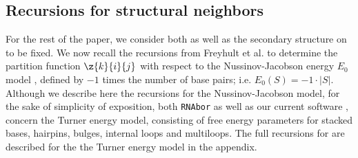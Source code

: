 \subsection*{Recursions for structural neighbors}

For the rest of the paper, we consider both \seq as well as the
secondary structure \strSt on \seq to be fixed. We now recall the
recursions from Freyhult et al. \cite{Freyhult.ab05} to determine
the partition function $\z{k}{i}{j}$ with
respect to the Nussinov-Jacobson
energy $E_0$ model \cite{nussinovJacobson}, defined by
$-1$ times the number of base pairs; i.e. $E_0(S) = -1 \cdot |S|$.
Although we describe here the recursions for the Nussinov-Jacobson
model, for the sake of
simplicity of exposition, both {\tt RNAbor}
\cite{Freyhult.ab05} as well as our current software \fftbor,
concern the Turner energy model, consisting of free energy parameters for
stacked bases, hairpins, bulges, internal loops and multiloops. The full
recursions for \fftbor are described for the
the Turner energy model in the appendix.


